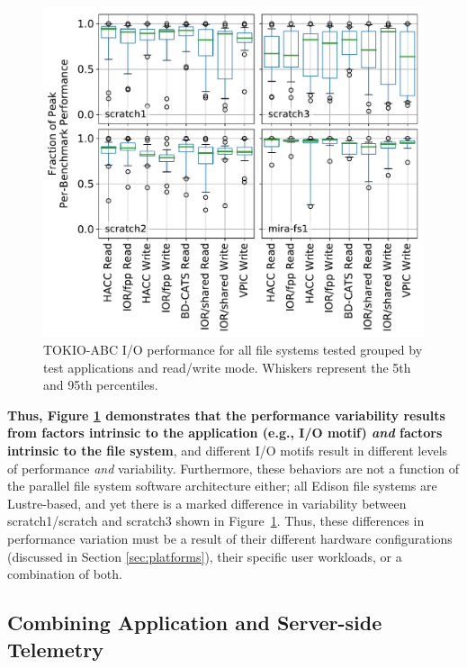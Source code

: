 \documentclass[conference,10pt,compsocconf]{IEEEtran}
\begin{document}
\begin{figure}[t]
	\centering
	\includegraphics[width=1.0\columnwidth]{figs/perf-boxplots.pdf}
	\caption{TOKIO-ABC I/O performance for all file systems tested grouped by test
	applications and read/write mode.  Whiskers represent the 5th and 95th
	percentiles.}
	\label{fig:perf-summary-boxplots-motif}
\end{figure}

\textbf{Thus, Figure \ref{fig:perf-summary-boxplots-motif} demonstrates that the
performance variability results from factors intrinsic to the application (e.g., I/O motif) \emph{and} factors intrinsic to the file system}, and
different I/O motifs result in different levels of performance \emph{and} variability.  Furthermore, these behaviors are not a function of the parallel file system software architecture either; all Edison file systems are Lustre-based, and yet there is a marked difference in variability between scratch1/scratch and scratch3 shown in Figure~\ref{fig:perf-summary-boxplots-motif}.  Thus, these differences in performance variation must be a result of their different hardware configurations (discussed in Section \ref{sec:platforms}), their specific user workloads, or a combination of both.

\subsection{Combining Application and Server-side Telemetry} \label{sec:results/combining}
\end{document}
